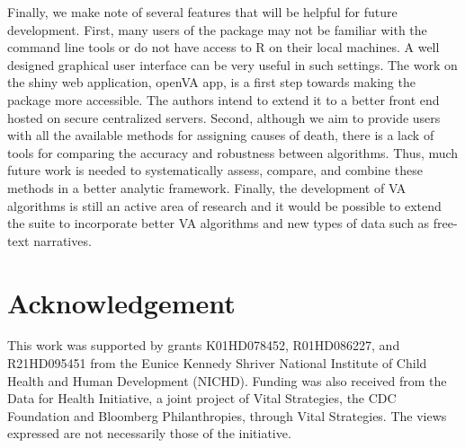 Finally, we make note of several features that will be helpful for
future development. First, many users of the  package
may not be familiar with the command line tools or do not have access to
R on their local machines. A well designed graphical user interface can
be very useful in such settings. The work on the shiny web application,
openVA app, is a first step towards making the package more accessible.
The authors intend to extend it to a better front end hosted on secure
centralized servers. Second, although we aim to provide users with all
the available methods for assigning causes of death, there is a lack of
tools for comparing the accuracy and robustness between algorithms.
Thus, much future work is needed to systematically assess, compare, and
combine these methods in a better analytic framework. Finally, the
development of VA algorithms is still an active area of research and it
would be possible to extend the  suite to incorporate
better VA algorithms and new types of data such as free-text narratives.

\hypertarget{acknowledgement}{%
\section{Acknowledgement}\label{acknowledgement}}

This work was supported by grants K01HD078452, R01HD086227, and
R21HD095451 from the Eunice Kennedy Shriver National Institute of Child
Health and Human Development (NICHD). Funding was also received from the
Data for Health Initiative, a joint project of Vital Strategies, the CDC
Foundation and Bloomberg Philanthropies, through Vital Strategies. The
views expressed are not necessarily those of the initiative.



\address{%
Zehang Richard Li\\
University of California, Santa Cruz\\%
Santa Cruz CA, USA\\
%
%
\textit{ORCiD: \href{https://orcid.org/0000-0001-9551-9638}{0000-0001-9551-9638}}\\%
\href{mailto:lizehang@ucsc.edu}{\nolinkurl{lizehang@ucsc.edu}}%
}

\address{%
Jason Thomas\\
The Ohio State University\\%
Columbus, OH, USA\\
%
%
\textit{ORCiD: \href{https://orcid.org/0000-0002-7694-3262}{0000-0002-7694-3262}}\\%
\href{mailto:thomas.3912@osu.edu}{\nolinkurl{thomas.3912@osu.edu}}%
}

